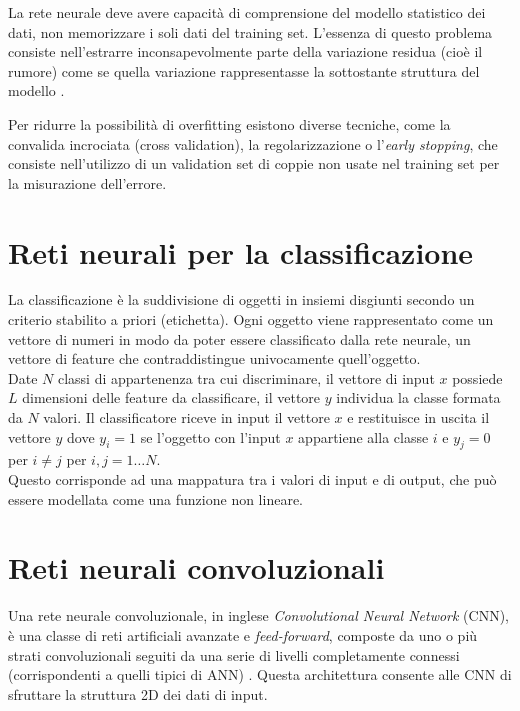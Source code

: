 La rete neurale deve avere capacità di comprensione del modello statistico dei dati, non memorizzare i soli dati del training set. L'essenza di questo problema consiste nell'estrarre inconsapevolmente parte della variazione residua (cioè il rumore) come se quella variazione rappresentasse la sottostante struttura del modello \cite{burnham2003model}.

Per ridurre la possibilità di overfitting esistono diverse tecniche, come la convalida incrociata (cross validation), la regolarizzazione o l'\emph{early stopping}, che consiste nell'utilizzo di un validation set di coppie non usate nel training set per la misurazione dell'errore.

\section{Reti neurali per la classificazione}
\label{sec:classificazione}
La classificazione è la suddivisione di oggetti in insiemi disgiunti secondo un criterio stabilito a priori (etichetta). Ogni oggetto viene rappresentato come un vettore di numeri in modo da poter essere classificato dalla rete neurale, un vettore di feature che contraddistingue univocamente quell'oggetto.\\

Date $N$ classi di appartenenza tra cui discriminare, il vettore di input $x$ possiede $L$ dimensioni delle feature da classificare, il vettore $y$ individua la classe formata da $N$ valori. Il classificatore riceve in input il vettore $x$ e restituisce in uscita il vettore $y$ dove $y_i=1$ se l'oggetto con l'input $x$ appartiene alla classe $i$ e $y_j=0$ per $i\neq j$ per $i,j=1 \dots N$.\\
Questo corrisponde ad una mappatura tra i valori di input e di output, che può essere modellata come una funzione non lineare.

\section{Reti neurali convoluzionali}
\label{sec:cnn}
Una rete neurale convoluzionale, in inglese \emph{Convolutional Neural Network} (CNN), è una classe di reti artificiali avanzate e \emph{feed-forward}, composte da uno o più strati convoluzionali seguiti da una serie di livelli completamente connessi (corrispondenti a quelli tipici di ANN) \cite{kim2014convolutional}. Questa architettura consente alle CNN di sfruttare la struttura 2D dei dati di input.\\

